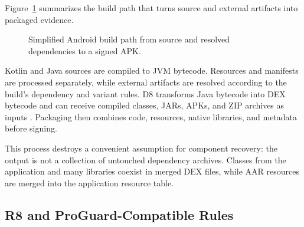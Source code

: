 Figure~\ref{fig:pfe-background-build-pipeline} summarizes the build path that
turns source and external artifacts into packaged evidence.

\begin{figure}[H]
\centering
{}
\caption{Simplified Android build path from source and resolved dependencies
to a signed APK.}
\label{fig:pfe-background-build-pipeline}
\end{figure}

Kotlin and Java sources are compiled to JVM bytecode. Resources and manifests
are processed separately, while external artifacts are resolved according to
the build's dependency and variant rules. D8 transforms Java bytecode into DEX
bytecode and can receive compiled classes, JARs, APKs, and ZIP archives as
inputs \cite{androidD8}. Packaging then combines code, resources, native
libraries, and metadata before signing.

This process destroys a convenient assumption for component recovery: the
output is not a collection of untouched dependency archives. Classes from the
application and many libraries coexist in merged DEX files, while AAR
resources are merged into the application resource table.

\subsection{R8 and ProGuard-Compatible Rules}

